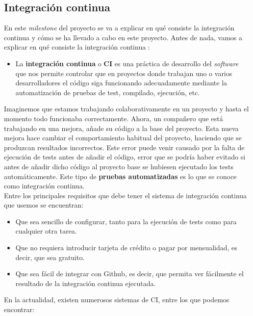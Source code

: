 \subsection{Integración continua}
En este \textit{milestone} del proyecto se va a explicar en qué consiste la integración
continua y cómo se ha llevado a cabo en este proyecto. Antes de nada, vamos a explicar en
qué consiste la integración continua \cite{continuous-integration}:

    \begin{itemize}
        \item La \textbf{integración continua} o \textbf{CI} es una práctica de desarrollo
        del \textit{software} que nos permite controlar que en proyectos donde trabajan uno
        o varios desarrolladores el código siga funcionando adecuadamente mediante la
        automatización de pruebas de test, compilado, ejecución, etc.
    \end{itemize}

Imaginemos que estamos trabajando colaborativamente en un proyecto y hasta el momento todo
funcionaba correctamente. Ahora, un compañero que está trabajando en una mejora, añade su
código a la base del proyecto. Esta nueva mejora hace cambiar el comportamiento habitual del
proyecto, haciendo que se produzcan resultados incorrectos. Este error puede venir causado
por la falta de ejecución de tests antes de añadir el código, error que se podría haber
evitado si antes de añadir dicho código al proyecto base se hubiesen ejecutado los tests
automáticamente. Este tipo de \textbf{pruebas automatizadas} es lo que se conoce como
integración continua.\\

Entre los principales requisitos que debe tener el sistema de integración continua que
usemos se encuentran:

    \begin{itemize}
        \item Que sea sencillo de configurar, tanto para la ejecución de tests como para
        cualquier otra tarea.
        \item Que no requiera introducir tarjeta de crédito o pagar por mensualidad, es
        decir, que sea gratuito.
        \item Que sea fácil de integrar con Github, es decir, que permita ver fácilmente el
        resultado de la integración continua ejecutada.
    \end{itemize}

En la actualidad, existen numerosos sistemas de CI, entre los que podemos encontrar:

